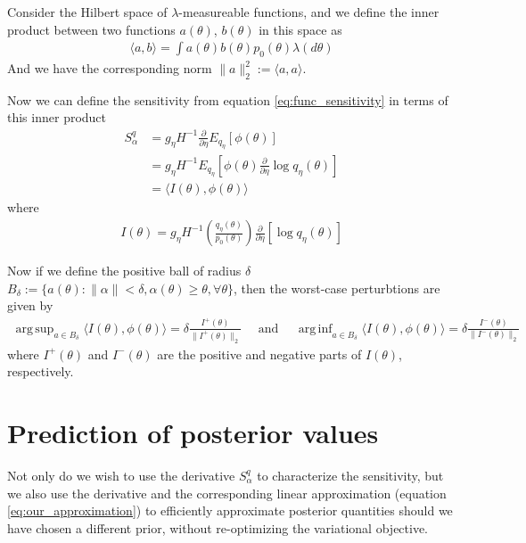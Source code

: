 \documentclass[a4paper]{article}
\DeclareMathOperator*{\argsup}{arg\,sup}
\DeclareMathOperator*{\arginf}{arg\,inf}
\begin{document}
Consider the Hilbert space of $\lambda$-measureable functions, and we
define the inner product between two functions $a(\theta)$,
$b(\theta)$ in this space
as
\begin{align}
	\langle a, b\rangle = \int a(\theta)b(\theta) p_0(\theta) \lambda(d\theta)
\end{align}
And we have the corresponding norm $\|a\|_2^2 := \langle a, a\rangle$.

Now we can define the sensitivity from equation \ref{eq:func_sensitivity}
in terms of this inner product
\begin{align}
	S^q_\alpha &= g_\eta H^{-1}\frac{\partial}{\partial \eta} E_{q_\eta}[\phi(\theta)]\\
		&= g_\eta H^{-1}E_{q_\eta}[\phi(\theta) \frac{\partial}{\partial \eta} \log q_\eta(\theta)]\\
		&= \langle I(\theta), \phi(\theta)\rangle
\end{align}
where
\begin{align}
	 I(\theta) = g_\eta H^{-1}(\frac{q_\eta(\theta)}{p_0(\theta)})\frac{\partial}{\partial \eta} [\log q_\eta(\theta)]
   \label{eq:influence_fun}
\end{align}

Now if we define the positive ball of radius $\delta$
$B_\delta := \{a(\theta) : \|\alpha\| < \delta, \alpha(\theta) \geq \theta, \forall \theta\}$,
then the worst-case perturbtions are given by
\begin{align}
  \label{eq:worst_case_perturbation}
	\argsup_{a \in B_\delta} \langle I(\theta), \phi(\theta)\rangle =
		\delta\frac{I^+(\theta)}{\|I^+(\theta)\|_2} \quad \text{ and } \quad
	\arginf_{a \in B_\delta} \langle I(\theta), \phi(\theta)\rangle =
		\delta\frac{I^-(\theta)}{\|I^-(\theta)\|_2}
\end{align}
where $I^+(\theta)$ and $I^-(\theta)$ are the positive and negative parts
of $I(\theta)$, respectively.

\section{Prediction of posterior values}
Not only do we wish to use the derivative $S^q_\alpha$ to characterize the sensitivity,
but we also use the derivative and the corresponding linear approximation
(equation \ref{eq:our_approximation})
to efficiently approximate posterior quantities should we have
chosen a different prior, without re-optimizing the variational objective.
\end{document}
